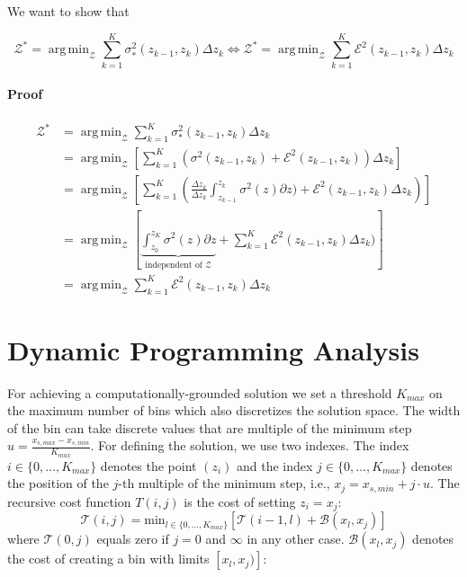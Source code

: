 \documentclass[twoside]{article}
\DeclareMathOperator*{\argmin}{arg\,min}
\begin{document}
We want to show that

\[ \mathcal{Z}^* = \argmin_{\mathcal{Z}} \sum_{k=1}^K \sigma_*^2(z_{k-1}, z_k) \Delta z_k \Leftrightarrow \mathcal{Z}^* = \argmin_{\mathcal{Z}} \sum_{k=1}^K \mathcal{E}^2(z_{k-1}, z_k) \Delta z_k \]

\paragraph{Proof}

\begin{align}
  \mathcal{Z}^* &= \argmin_{\mathcal{Z}} \sum_{k=1}^K \sigma_*^2(z_{k-1}, z_k) \Delta z_k \\
                & = \argmin_{\mathcal{Z}} \left [ \sum_{k=1}^K (\sigma^2(z_{k-1}, z_k) + \mathcal{E}^2(z_{k-1}, z_k)) \Delta z_k \right ] \\
                & = \argmin_{\mathcal{Z}} \left [ \sum_{k=1}^K \left ( \frac{\Delta z_k}{\Delta z_k} \int_{z_{k-1}}^{z_k} \sigma^2(z) \partial z)   + \mathcal{E}^2(z_{k-1}, z_k) \Delta z_k \right ) \right ] \\
                & = \argmin_{\mathcal{Z}} \left [ \underbrace{\int_{z_0}^{z_K} \sigma^2(z) \partial z}_{\text{independent of } \mathcal{Z}}   + \sum_{k=1}^K\mathcal{E}^2(z_{k-1}, z_k) \Delta z_k) \right ] \\
                & = \argmin_{\mathcal{Z}} \sum_{k=1}^K\mathcal{E}^2(z_{k-1}, z_k) \Delta z_k
  \end{align}

\section{Dynamic Programming Analysis}
\label{sec:dynamic-programming}

For achieving a computationally-grounded solution we set a threshold
\(K_{max}\) on the maximum number of bins which also discretizes the
solution space. The width of the bin can take discrete values that are
multiple of the minimum step
\(u = \frac{x_{s, max} - x_{s, min}}{K_{max}}\). For defining the
solution, we use two indexes. The index
\(i \in \{0, \ldots, K_{max}\}\) denotes the point \((z_i)\) and the
index \(j \in \{0, \ldots, K_{max}\} \) denotes the position of the
\(j\)-th multiple of the minimum step, i.e.,
\(x_j = x_{s,min} + j \cdot u\). The recursive cost function
\(T(i,j)\) is the cost of setting \(z_i=x_j\):
\begin{equation}
  \label{eq:recursive_cost}
  \mathcal{T}(i,j) = \mathrm{min}_{l \in \{0, \ldots, K_{max}\}} \left [ \mathcal{T}(i-1, l) + \mathcal{B}(x_l, x_j) \right ]
\end{equation}
%
where \(\mathcal{T}(0,j)\) equals zero if \(j=0\) and \(\infty\) in
any other case. \(\mathcal{B}(x_l, x_j)\) denotes the cost of creating a bin
with limits \([x_l, x_j)]\):
\end{document}
